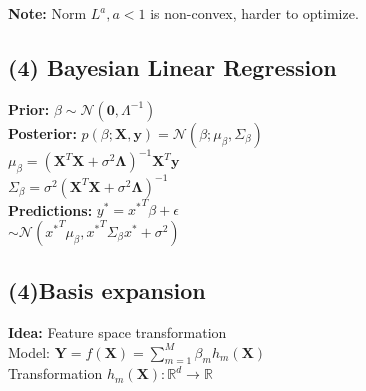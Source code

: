 \textbf{Note:} Norm $L^a, a<1$ is non-convex, harder to optimize.

\subsection*{(4) Bayesian Linear Regression}
\textbf{Prior:} $\beta\sim\mathcal{N}(\mathbf{0},\Lambda^{-1})$\\
\textbf{Posterior:} $p(\beta;\mathbf{X},\mathbf{y}) = \mathcal{N}(\beta; \mu_{\beta}, \Sigma_{\beta})$\\
$\mu_\beta = (\mathbf{X}^T\mathbf{X} +\sigma^2\bm{\Lambda})^{-1}\mathbf{X}^T\mathbf{y}$\\
$\Sigma_\beta = \sigma^2(\mathbf{X}^T\mathbf{X} +\sigma^2\bm{\Lambda})^{-1}$\\
\textbf{Predictions:}
$y^* = {x^*}^T\beta + \epsilon$\\$\sim \mathcal{N}({x^*}^T\mu_{\beta}, {x^*}^T\Sigma_{\beta}{x^*}+\sigma^2)$
\subsection*{(4)Basis expansion}
\textbf{Idea:} Feature space transformation\\
Model: $\mathbf{Y}=f(\mathbf{X})=\sum_{m=1}^M\beta_m h_m(\mathbf{X})$\\
Transformation $h_m(\mathbf{X}):\mathbb{R}^d \rightarrow \mathbb{R}$

